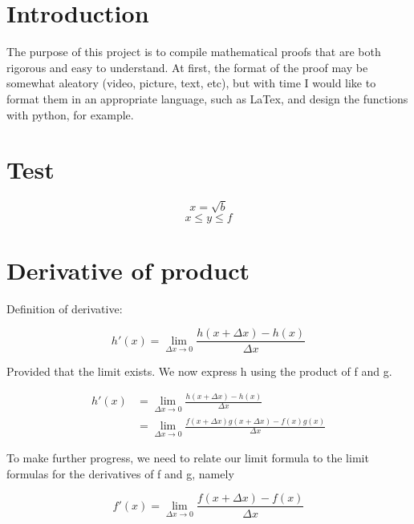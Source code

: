 \documentclass[11pt]{article}
\author{Roland Coeurjoly}
\date{\today}
\title{}
\begin{document}
\tableofcontents

\section{Introduction}
\label{sec:orga988734}
The purpose of this project is to compile mathematical proofs that are both rigorous and easy to understand.
At first, the format of the proof may be somewhat aleatory (video, picture, text, etc), but with time I would like to format them in an appropriate language, such as LaTex, and design the functions with python, for example.
\section{Test}
\label{sec:org7883383}

\begin{equation}                        %
x=\sqrt{b}                              %
\end{equation}
\begin{equation}
x\leq{y}\leq{f}
\end{equation}
\section{Derivative of product}
\label{sec:orge46fcbd}
Definition of derivative:

\begin{equation}
h\ensuremath{'}(x) = \lim_{\Delta{x} \to 0}\frac{h(x+\Delta {x}) - h(x)}{\Delta x}
\end{equation}

Provided that the limit exists. We now express h using the product of f and g.

\begin{equation}
\begin{split}
h\ensuremath{'}(x) &= \lim_{\Delta{x} \to 0}\frac{h(x+\Delta {x}) - h(x)}{\Delta x} \\
                   &= \lim_{\Delta{x} \to 0}\frac{f(x+\Delta {x})g(x+\Delta {x}) - f(x)g(x)}{\Delta x}
\end{split}
\end{equation}

To make further progress, we need to relate our limit formula to the limit formulas for the derivatives of f and g, namely


\begin{equation}
f\ensuremath{'}(x) = \lim_{\Delta{x} \to 0}\frac{f(x+\Delta {x}) - f(x)}{\Delta x}
\end{equation}
\end{document}
